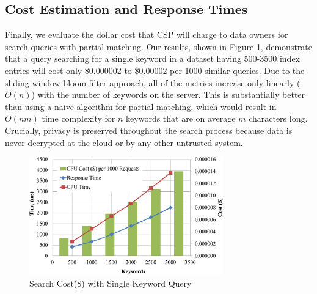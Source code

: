 \subsection{Cost Estimation and Response Times}

Finally, we evaluate the dollar cost that CSP will charge to data owners for search
queries with partial matching. 
Our results, shown in Figure \ref{fig:cost_single_query}, demonstrate that a query
searching for a single keyword in a dataset having 500-3500 index entries will cost only 
\$0.000002 to \$0.00002 per 1000 similar
queries. Due to the sliding window bloom filter approach, 
all of the metrics increase only linearly ($O(n)$) with the number
of keywords on the server. This is substantially better than using a naive algorithm 
for partial matching, which would result in $O(nm)$ time complexity 
for $n$ keywords that are on average $m$ characters long. Crucially,
privacy is preserved throughout the search process because data is never
decrypted at the cloud or by any other untrusted system.


\begin{figure}
  \centering
  \includegraphics[width=3.3in]{figures/cost_keywords_graph.png}
  \caption{Search Cost(\$) with Single Keyword Query}
  \label{fig:cost_single_query}
\end{figure}
